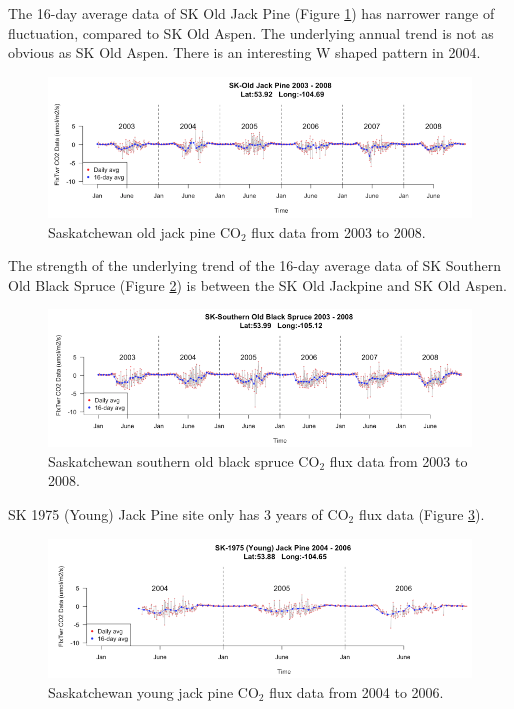 \documentclass{article}\usepackage[]{graphicx}\usepackage[]{color}
\begin{document}
The 16-day average data of SK Old Jack Pine (Figure \ref{Fig:OJPmodis}) has narrower range of fluctuation, compared to SK Old Aspen. The underlying annual trend is not as obvious as SK Old Aspen.  There is an interesting W shaped pattern in 2004.




\begin{figure}[!ht]
\centering
\includegraphics[width=14cm]{OJPmodis1.png}
\caption{Saskatchewan old jack pine CO$_2$ flux data from 2003 to 2008.}
\label{Fig:OJPmodis}
\end{figure}


The strength of the underlying trend of the 16-day average data of SK Southern Old Black Spruce (Figure \ref{Fig:SOUmodis}) is between the SK Old Jackpine and SK Old Aspen.



\begin{figure}[!ht]
\centering
\includegraphics[width=14cm]{SOUmodis1.png}
\caption{Saskatchewan southern old black spruce CO$_2$ flux data from 2003 to 2008.}
\label{Fig:SOUmodis}
\end{figure}

SK 1975 (Young) Jack Pine site only has 3 years of CO$_2$ flux data (Figure \ref{Fig:YJPmodis}).




\begin{figure}[!ht]
\centering
\includegraphics[width=14cm]{YJPmodis1.png}
\caption{Saskatchewan young jack pine CO$_2$ flux data from 2004 to 2006.}
\label{Fig:YJPmodis}
\end{figure}
\end{document}
